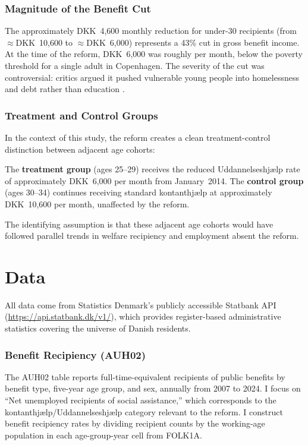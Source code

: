\documentclass[12pt]{article}
\begin{document}
\subsubsection*{Magnitude of the Benefit Cut} The approximately DKK~4,600 monthly reduction for under-30 recipients (from $\approx$DKK~10,600 to $\approx$DKK~6,000) represents a 43\% cut in gross benefit income. At the time of the reform, DKK~6,000 was roughly  per month, below the poverty threshold for a single adult in Copenhagen. The severity of the cut was controversial: critics argued it pushed vulnerable young people into homelessness and debt rather than education \citep{christensen2017}.

\subsubsection*{Treatment and Control Groups} In the context of this study, the reform creates a clean treatment-control distinction between adjacent age cohorts:

The \textbf{treatment group} (ages 25--29) receives the reduced Uddannelses\-hjælp rate of approximately DKK~6,000 per month from January~2014. The \textbf{control group} (ages 30--34) continues receiving standard kontanthjælp at approximately DKK~10,600 per month, unaffected by the reform.

The identifying assumption is that these adjacent age cohorts would have followed parallel trends in welfare recipiency and employment absent the reform.

\section{Data}

All data come from Statistics Denmark's publicly accessible Statbank API (\url{https://api.statbank.dk/v1/}), which provides register-based administrative statistics covering the universe of Danish residents.

\subsubsection*{Benefit Recipiency (AUH02)} The AUH02 table reports full-time-equivalent recipients of public benefits by benefit type, five-year age group, and sex, annually from 2007 to 2024. I focus on ``Net unemployed recipients of social assistance,'' which corresponds to the kontanthjælp/Uddannelseshjælp category relevant to the reform. I construct benefit recipiency rates by dividing recipient counts by the working-age population in each age-group-year cell from FOLK1A.
\end{document}
